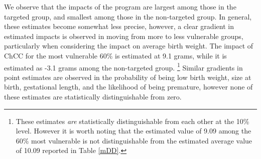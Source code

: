 \documentclass[12pt]{article}
\begin{document}
\begin{spacing}{1.4}
We observe that the impacts of the program are largest among
those in the targeted group, and smallest among those in the
non-targeted group.  In general, these estimates become somewhat
less precise, however, a clear gradient in estimated impacts is
observed in moving from more to less vulnerable groups, particularly
when considering the impact on average birth weight. The impact of
ChCC for the most vulnerable 60\% is estimated at 9.1 grams, while
it is estimated as -3.1 grams among the non-targeted group.%
\footnote{These estimates \emph{are} statistically distinguishable
  from each other at the 10\% level.  However it is worth noting
  that the estimated value of 9.09 among the 60\% most vulnerable
  is not distinguishable from the estimated average value of 10.09
  reported in Table \ref{mDD}.}
Similar gradients in point estimates are observed in the
probability of being low birth weight, size at birth, gestational
length, and the likelihood of being premature, however none of
these estimates are statistically distinguishable from zero.


\end{spacing}
\end{document}
